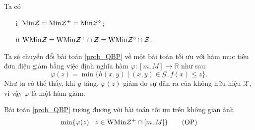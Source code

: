 \begin{md} \label{lem_MinY} Ta có
    \begin{itemize}
        \item[i] $\;{\rm Min}\mathcal{Z}={\rm Min}\mathcal{Z}^{+}={\rm Min}\mathcal{Z}^{\diamond}$; 
        \item[ii] ${\rm WMin}\mathcal{Z}={\rm WMin}\mathcal{Z}^{+}\cap\mathcal{Z}={\rm WMin}\mathcal{Z}^{\diamond}\cap\mathcal{Z}$.
    \end{itemize}
\end{md}

Ta sẽ chuyển đổi bài toán \ref{prob_QBP} về một bài toán tối ưu với hàm mục tiêu đơn điệu giảm bằng việc định nghĩa hàm $\varphi:[m,M] \longrightarrow\mathbb{R}$ như sau:
\[
\varphi(z)=\min\{h(x,y)\mid (x,y)\in \mathcal{G},f(x)\leq z\}.
\]
Như ta có thể thấy, khi $y$ tăng, $\varphi(z)$ giảm do sự dãn ra của không hữu hiệu $\mathcal{X}$, vì vậy $\varphi$ là một hàm giảm.
\begin{md}\label{prop-QWP_Y}Bài toán \ref{prob_QBP} tương đương với bài toán tối ưu trên không gian ảnh
    \begin{equation}
    \min\{\varphi(z)\mid z\in{\rm WMin}\mathcal{Z}^{+}\cap[m,M]\}\tag*{(OP)}\label{prob_OP}
    \end{equation}
\end{md}
